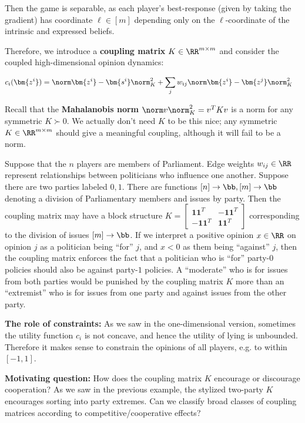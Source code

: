 Then the game is separable, as each player's best-response (given by taking the gradient) has coordinate $\ell \in [m]$ depending only on the $\ell$-coordinate of the intrinsic and expressed beliefs. 

Therefore, we introduce a {\bf coupling matrix} $K \in \RR^{m \times m}$ and consider the coupled high-dimensional opinion dynamics: 

\begin{align*}
c_i(\bm{z^i}) &= \norm \bm{z^i} - \bm{s^i} \norm_K^2
+ \sum_j w_{ij} \norm \bm{z^i} - \bm{z^j} \norm_K^2
\end{align*}

Recall that the {\bf Mahalanobis norm} $\norm v \norm_K^2 = v^T K v$ is a norm for any symmetric $K \succ 0$. We actually don't need $K$ to be this nice; any symmetric $K \in \RR^{m \times m}$ should give a meaningful coupling, although it will fail to be a norm. 

\begin{example}
Suppose that the $n$ players are members of Parliament. Edge weights $w_{ij} \in \RR$ represent relationships between politicians who influence one another. Suppose there are two parties labeled $0, 1$. There are functions $[n] \to \bb, [m] \to \bb$ denoting a division of Parliamentary members and issues by party. Then the coupling matrix may have a block structure $K = \begin{bmatrix} \bm{1} \bm{1}^T & - \bm{1} \bm{1}^T \\ - \bm{1} \bm{1}^T & \bm{1} \bm{1}^T \end{bmatrix}$ corresponding to the division of issues $[m] \to \bb$. If we interpret a positive opinion $x \in \RR$ on opinion $j$ as a politician being ``for'' $j$, and $x < 0$ as them being ``against'' $j$, then the coupling matrix enforces the fact that a politician who is ``for'' party-$0$ policies should also be against party-$1$ policies. A ``moderate'' who is for issues from both parties would be punished by the coupling matrix $K$ more than an ``extremist'' who is for issues from one party and against issues from the other party.
\end{example}

{\bf The role of constraints:} As we saw in the one-dimensional version, sometimes the utility function $c_i$ is not concave, and hence the utility of lying is unbounded. Therefore it makes sense to constrain the opinions of all players, e.g. to within $[-1, 1]$. 

{\bf Motivating question:} How does the coupling matrix $K$ encourage or discourage cooperation? As we saw in the previous example, the stylized two-party $K$ encourages sorting into party extremes. Can we classify broad classes of coupling matrices according to competitive/cooperative effects?

